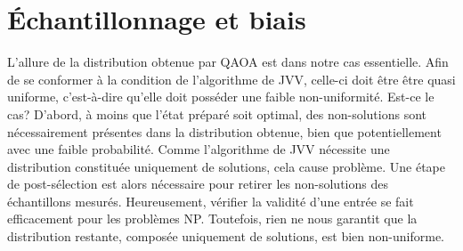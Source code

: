
\section{Échantillonnage et biais}
\label{sec:echantillonnage-et-biais}

L'allure de la distribution obtenue par QAOA est dans notre cas essentielle. Afin de se conformer à la condition de l'algorithme de JVV, celle-ci doit être être quasi uniforme, c'est-à-dire qu'elle doit posséder une faible non-uniformité. Est-ce le cas? D'abord, à moins que l'état préparé soit optimal, des non-solutions sont nécessairement présentes dans la distribution obtenue, bien que potentiellement avec une faible probabilité. Comme l'algorithme de JVV nécessite une distribution constituée uniquement de solutions, cela cause problème. Une étape de post-sélection est alors nécessaire pour retirer les non-solutions des échantillons mesurés. Heureusement, vérifier la validité d'une entrée se fait efficacement pour les problèmes \textsf{NP}. Toutefois, rien ne nous garantit que la distribution restante, composée uniquement de solutions, est bien non-uniforme.

